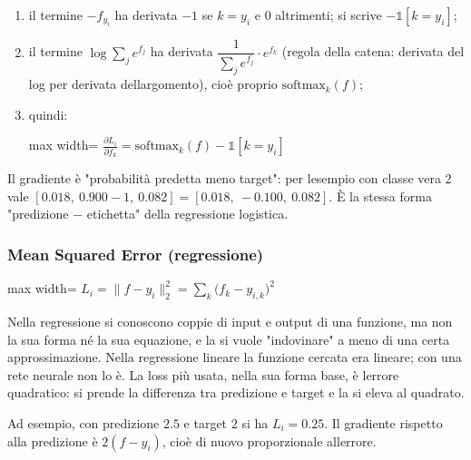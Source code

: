 \documentclass[11pt,a4paper,oneside,openany]{book}
\providecommand{\tightlist}{\setlength{\itemsep}{0pt}\setlength{\parskip}{0pt}}
\begin{document}
\begin{enumerate}
\def\labelenumi{\arabic{enumi}.}
\tightlist
\item
  il termine \(-f_{y_i}\) ha derivata \(-1\) se \(k = y_i\) e \(0\) altrimenti; si scrive \(-\mathbb{1}[k = y_i]\);
\item
  il termine \(\log\sum_j e^{f_j}\) ha derivata \(\dfrac{1}{\sum_j e^{f_j}}\cdot e^{f_k}\) (regola della catena: derivata del log per derivata dell\textquotesingle argomento), cioè proprio \(\text{softmax}_k(f)\);
\item
  quindi: \begin{center}
\begin{adjustbox}{max width=\linewidth}
$\displaystyle \boxed{\frac{\partial L_i}{\partial f_k} = \text{softmax}_k(f) - \mathbb{1}[k = y_i]}$
\end{adjustbox}
\end{center}
\end{enumerate}

Il gradiente è "probabilità predetta meno target": per l\textquotesingle esempio con classe vera 2 vale \([0.018,\ 0.900-1,\ 0.082] = [0.018,\ -0.100,\ 0.082]\). È la stessa forma "predizione − etichetta" della regressione logistica.

\subsubsection{Mean Squared Error (regressione)}\label{f01-r654}

\begin{center}
\begin{adjustbox}{max width=\linewidth}
$\displaystyle 
\boxed{L_i = \lVert f - y_i \rVert_2^2 = \sum_k \big(f_k - y_{i,k}\big)^2}
$
\end{adjustbox}
\end{center}

Nella regressione si conoscono coppie di input e output di una funzione, ma non la sua forma né la sua equazione, e la si vuole "indovinare" a meno di una certa approssimazione. Nella regressione lineare la funzione cercata era lineare; con una rete neurale non lo è. La loss più usata, nella sua forma base, è l\textquotesingle errore quadratico: si prende la differenza tra predizione e target e la si eleva al quadrato.

Ad esempio, con predizione \(2.5\) e target \(2\) si ha \(L_i = 0.25\). Il gradiente rispetto alla predizione è \(2(f - y_i)\), cioè di nuovo proporzionale all\textquotesingle errore.
\end{document}

